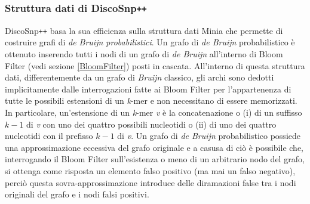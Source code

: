 \documentclass[../main.tex]{subfiles}
\begin{document}
%
%
%
%
%
%


\subsubsection{Struttura dati di DiscoSnp\texttt{++}}
\label{dBG_prob}

DiscoSnp\texttt{++} basa la sua efficienza sulla struttura dati Minia \cite{chikhi2013space} che permette di costruire grafi di \textit{de Bruijn probabilistici}. Un grafo di \textit{de Bruijn} probabilistico è ottenuto inserendo tutti i nodi di un grafo di \textit{de Bruijn} all'interno di Bloom Filter (vedi sezione \ref{BloomFilter}) posti in cascata. All'interno di questa struttura dati, differentemente da un grafo di \textit{Bruijn} classico, gli archi sono dedotti implicitamente dalle interrogazioni fatte ai Bloom Filter per l'appartenenza di tutte le possibili estensioni di un \textit{k}-mer e non necessitano di essere memorizzati. In particolare, un'estensione di un \textit{k}-mer \textit{v} è la concatenazione o (i) di un suffisso $k-1$ di \textit{v} con uno dei quattro possibili nucleotidi o (ii) di uno dei quattro nucleotidi con il prefisso  $k-1$ di \textit{v}. Un grafo di \textit{de Bruijn} probabilistico possiede una approssimazione eccessiva del grafo originale e a casusa di ciò è possibile che, interrogando il Bloom Filter sull'esistenza o meno di un arbitrario nodo del grafo, si ottenga come risposta un elemento falso positivo (ma mai un falso negativo), perciò questa sovra-approssimazione introduce delle diramazioni false tra i nodi originali del grafo e i nodi falsi positivi.
\end{document}
